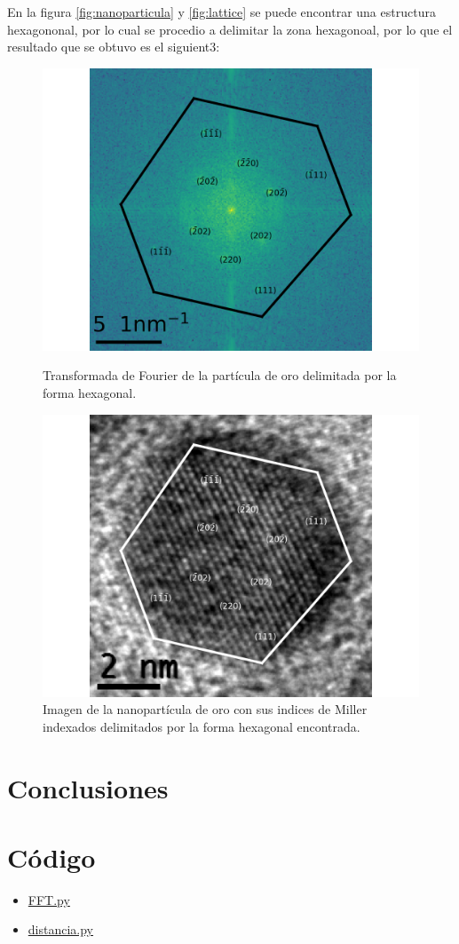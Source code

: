 \documentclass[reprint,amsmath,amssymb,aps,]{revtex4-2}
\begin{document}
En la figura \ref{fig:nanoparticula} y \ref{fig:lattice} se puede encontrar una estructura hexagononal, por lo cual se procedio a delimitar la zona hexagonoal, por lo que el resultado que se obtuvo es el siguient3:
\begin{figure}[H]
    \includegraphics[scale=0.4]{../Graphics/hexa.png}
    \caption{Transformada de Fourier de la partícula de oro delimitada por la forma hexagonal.}
    \includegraphics[scale=0.4]{../Graphics/nano_ind.png}
    \caption{Imagen de la nanopartícula de oro con sus indices de Miller indexados delimitados por la forma hexagonal encontrada.}
\end{figure}
\section{Conclusiones}
\section{Código}
\begin{itemize}
    \item \href{https://github.com/giovannilopez9808/Notas_Agosto_2020/blob/master/AMC/Reto2/FFT.py}{FFT.py}
    \item \href{https://github.com/giovannilopez9808/Notas_Agosto_2020/blob/master/AMC/Reto2/distancia.py}{distancia.py}
\end{itemize}

\nocite{*}

\end{document}
